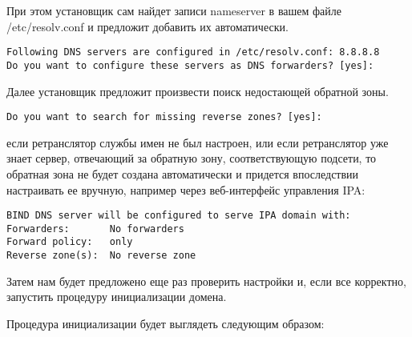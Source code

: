 \documentclass[a4paper,10pt,twoside]{article}
\begin{document}
При этом установщик сам найдет записи nameserver в вашем файле /etc/resolv.conf и предложит добавить их автоматически.

\begin{verbatim}
Following DNS servers are configured in /etc/resolv.conf: 8.8.8.8
Do you want to configure these servers as DNS forwarders? [yes]:
\end{verbatim} 

Далее установщик предложит произвести поиск недостающей обратной зоны.

\begin{verbatim}
Do you want to search for missing reverse zones? [yes]:
\end{verbatim} 

 если ретранслятор службы имен не был настроен, или если ретранслятор уже знает сервер, отвечающий за обратную зону, соответствующую подсети, то обратная зона не будет создана автоматически и придется впоследствии настраивать ее вручную, например через веб-интерфейс управления IPA:

\begin{verbatim}
BIND DNS server will be configured to serve IPA domain with:
Forwarders:       No forwarders
Forward policy:   only
Reverse zone(s):  No reverse zone
\end{verbatim} 

Затем нам будет предложено еще раз проверить настройки и, если все корректно, запустить процедуру инициализации домена.

Процедура инициализации будет выглядеть следующим образом:
\end{document}
